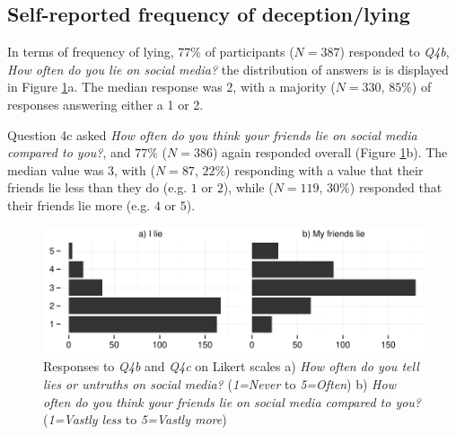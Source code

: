 \documentclass{sig-alternate}
\begin{document}
\subsection{Self-reported frequency of deception/lying}

In terms of frequency of lying, $77\%$ of participants ($N=387$) responded to \emph{Q4b}, \emph{How often do you lie on social media?} 
the distribution of answers is is displayed in Figure \ref{fig:freqlying}a.  The median response was 2, with a majority ($N=330$, $85\%$) of responses answering either a 1 or 2. %

Question 4c asked \emph{How often do you think your friends lie on social media compared to you?}, 
and $77\%$ ($N=386$) again responded overall (Figure \ref{fig:freqlying}b). 
The median value was $3$, with ($N=87$, $22\%$) responding with a value that their friends lie less than they do (e.g. $1$ or $2$), while ($N=119$, $30\%$) responded that their friends lie more (e.g. $4$ or $5$).


\begin{figure}[tbp]
 	\begin{center}
        \includegraphics[width=1.0\columnwidth]{figs/q4cgraph}
    \end{center}
    \caption{%
    Responses to \emph{Q4b} and \emph{Q4c} on Likert scales 
    a) \emph{How often do you tell lies or untruths on social media?} 
    (\emph{1=Never} to \emph{5=Often})
    b) \emph{How often do you think your friends lie on social media compared to you?}
    (\emph{1=Vastly less} to \emph{5=Vastly more}) 
     }%
   \label{fig:freqlying}
\end{figure}
\end{document}
